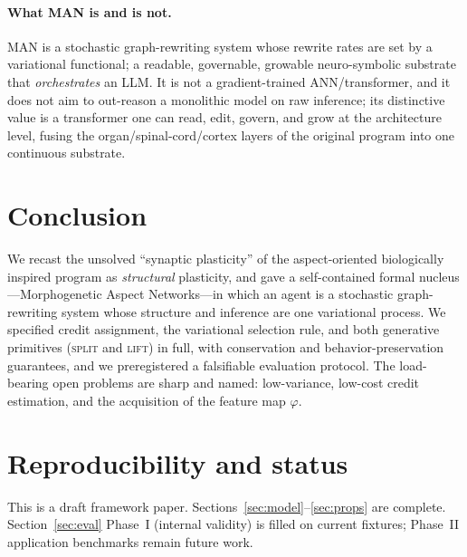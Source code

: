 \documentclass[11pt]{article}
\theoremstyle{definition}
\begin{document}
\paragraph{What MAN is and is not.}
MAN is a stochastic graph-rewriting system whose rewrite rates are set by a
variational functional; a readable, governable, growable neuro-symbolic
substrate that \emph{orchestrates} an LLM. It is not a gradient-trained
ANN/transformer, and it does not aim to out-reason a monolithic model on raw
inference; its distinctive value is a transformer one can read, edit, govern,
and grow at the architecture level, fusing the organ/spinal-cord/cortex
layers of the original program into one continuous substrate.

\section{Conclusion}

We recast the unsolved ``synaptic plasticity'' of the aspect-oriented
biologically inspired program as \emph{structural} plasticity, and gave a
self-contained formal nucleus---Morphogenetic Aspect Networks---in which an
agent is a stochastic graph-rewriting system whose structure and inference
are one variational process. We specified credit assignment, the variational
selection rule, and both generative primitives (\textsc{split} and
\textsc{lift}) in full, with conservation and behavior-preservation
guarantees, and we preregistered a falsifiable
evaluation protocol. The load-bearing open problems are sharp and named:
low-variance, low-cost credit estimation, and the acquisition of the feature
map $\varphi$.

\section*{Reproducibility and status}
This is a draft framework paper. Sections~\ref{sec:model}--\ref{sec:props}
are complete. Section~\ref{sec:eval} Phase~I (internal validity) is filled on
current fixtures; Phase~II application benchmarks remain future work.
\end{document}
